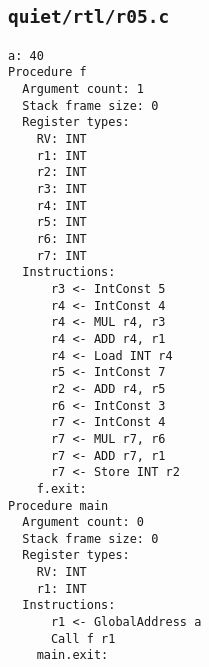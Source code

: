 \documentclass[a4paper,11pt]{article}
\begin{document}
\subsection{\texttt{quiet/rtl/r05.c}}
\begin{lstlisting}
a: 40
Procedure f
  Argument count: 1
  Stack frame size: 0
  Register types:
    RV: INT
    r1: INT
    r2: INT
    r3: INT
    r4: INT
    r5: INT
    r6: INT
    r7: INT
  Instructions:
      r3 <- IntConst 5
      r4 <- IntConst 4
      r4 <- MUL r4, r3
      r4 <- ADD r4, r1
      r4 <- Load INT r4
      r5 <- IntConst 7
      r2 <- ADD r4, r5
      r6 <- IntConst 3
      r7 <- IntConst 4
      r7 <- MUL r7, r6
      r7 <- ADD r7, r1
      r7 <- Store INT r2
    f.exit:
Procedure main
  Argument count: 0
  Stack frame size: 0
  Register types:
    RV: INT
    r1: INT
  Instructions:
      r1 <- GlobalAddress a
      Call f r1
    main.exit:
\end{lstlisting}
\end{document}
